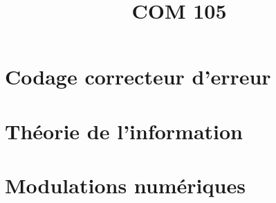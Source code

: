 \documentclass[a4paper,11pt]{article}
\title{\vspace{-1.2cm} \textbf{COM 105}}
\begin{document}
\maketitle

\vspace{-1.5cm}

\section{Codage correcteur d'erreur}

	

\section{Théorie de l'information}

	

\section{Modulations numériques}

	
\end{document}
